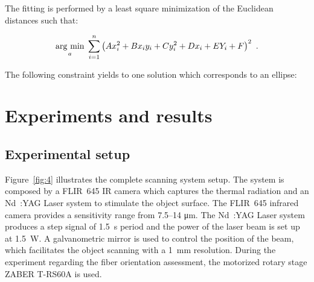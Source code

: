 \documentclass[12pt]{spieman}
\begin{document}
\begin{spacing}{2}
The fitting is performed by a least square minimization of the Euclidean distances such that:

\begin{equation}
  \underset{a}{\operatorname{arg}\,\operatorname{min}}\; \sum_{i=1}^{n} \left( A x_i^2 + B x_i y_i + C y_i^2 + D x_i + E Y_i + F \right)^2 \ .
\end{equation}

The following constraint yields to one solution which corresponds to an ellipse:


% 
\graphicspath{ {./content/exp/figure/} }

\section{Experiments and results}\label{sec:4}

\subsection{Experimental setup}




Figure~\ref{fig:4} illustrates the complete scanning system setup. The system is composed by a FLIR~645 IR camera which captures the thermal radiation and an Nd~:YAG Laser system to stimulate the object surface. 
The FLIR~645 infrared camera provides a sensitivity range from \numrange{7.5}{14} \si{\micro \metre}.
The Nd~:YAG Laser system produces a step signal of \SI{1.5}{\second} period and the power of the laser beam is set up at \SI{1.5}{\watt}. 
A galvanometric mirror is used to control the position of the beam, which facilitates the object scanning with a \SI{1}{\milli \metre} resolution. 
During the experiment regarding the fiber orientation assessment, the motorized rotary stage ZABER T-RS60A is used.


\end{spacing}
\end{document}
